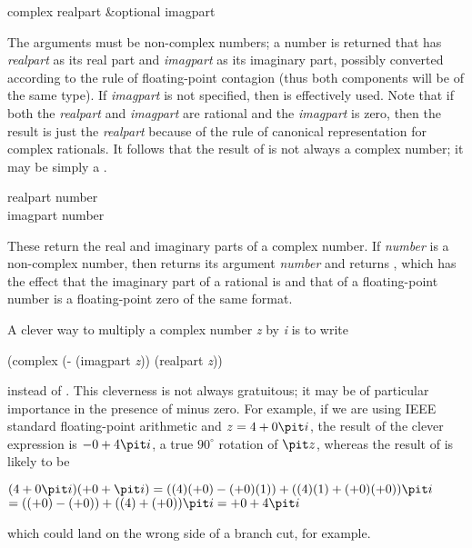 \begin{defun}[Function]
complex realpart &optional imagpart

The arguments must be non-complex numbers; a number is returned
that has {\it realpart} as its real part and {\it imagpart} as its imaginary
part, possibly converted according to the rule of floating-point
contagion (thus both components will be of the same type).
If {\it imagpart} is not specified,
then  is
effectively used.  Note that if both the {\it realpart} and {\it imagpart} are
rational and the {\it imagpart} is zero, then the result is just the
{\it realpart} because of the rule of canonical representation
for complex rationals.  It follows that the result of 
is not always a complex number; it may be simply a .
\end{defun}

\begin{defun}[Function]
realpart number \\
imagpart number

These return the real and imaginary parts of a complex number.  If
{\it number} is a non-complex number, then  returns its
argument {\it number} and 
returns , which
has the effect that the imaginary part of a rational is  and that of
a floating-point number is a floating-point zero of the same format.

\begin{newer}
A clever way to multiply a complex number {\it z} by {\it i} is to write
\begin{lisp}
(complex (- (imagpart {\it z})) (realpart {\it z}))
\end{lisp}
instead of .  This cleverness is not always
gratuitous; it may be of particular importance in the presence of minus
zero.  For example, if we are using IEEE standard floating-point arithmetic
and $z=4+0{\it i}$, the result of the clever expression is $-0+4{\it i}$, a true
$90^\circ$ rotation of ${\it z}$, whereas the result of 
is likely to be
\begin{tabbing}
\( (4+0{\it i\/})(+0+{\it i\/}) = ((4)(+0) - (+0)(1)) + ((4)(1) + (+0)(+0)){\it i} \) \\
\hskip2pc\( = ((+0)-(+0))+((4)+(+0)){\it i} = +0+4{\it i} \)
\end{tabbing}
which could
land on the wrong side of a branch cut, for example.
\end{newer}
\end{defun}


